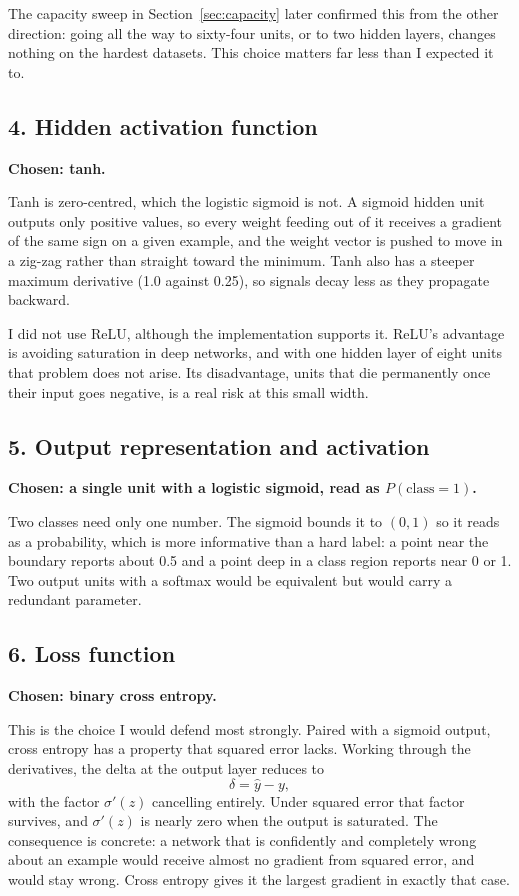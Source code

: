 \documentclass[11pt]{article}
\begin{document}
The capacity sweep in Section~\ref{sec:capacity} later confirmed this from the
other direction: going all the way to sixty-four units, or to two hidden layers,
changes nothing on the hardest datasets. This choice matters far less than I
expected it to.

\subsection*{4. Hidden activation function}
\textbf{Chosen: tanh.}

Tanh is zero-centred, which the logistic sigmoid is not. A sigmoid hidden unit
outputs only positive values, so every weight feeding out of it receives a
gradient of the same sign on a given example, and the weight vector is pushed to
move in a zig-zag rather than straight toward the minimum. Tanh also has a
steeper maximum derivative (1.0 against 0.25), so signals decay less as they
propagate backward.

I did not use ReLU, although the implementation supports it. ReLU's advantage is
avoiding saturation in deep networks, and with one hidden layer of eight units
that problem does not arise. Its disadvantage, units that die permanently once
their input goes negative, is a real risk at this small width.

\subsection*{5. Output representation and activation}
\textbf{Chosen: a single unit with a logistic sigmoid, read as $P(\text{class}=1)$.}

Two classes need only one number. The sigmoid bounds it to $(0,1)$ so it reads
as a probability, which is more informative than a hard label: a point near the
boundary reports about 0.5 and a point deep in a class region reports near 0 or
1. Two output units with a softmax would be equivalent but would carry a
redundant parameter.

\subsection*{6. Loss function}
\textbf{Chosen: binary cross entropy.}

This is the choice I would defend most strongly. Paired with a sigmoid output,
cross entropy has a property that squared error lacks. Working through the
derivatives, the delta at the output layer reduces to
\[
\delta = \hat{y} - y,
\]
with the factor $\sigma'(z)$ cancelling entirely. Under squared error that
factor survives, and $\sigma'(z)$ is nearly zero when the output is saturated.
The consequence is concrete: a network that is confidently and completely wrong
about an example would receive almost no gradient from squared error, and would
stay wrong. Cross entropy gives it the largest gradient in exactly that case.
\end{document}
